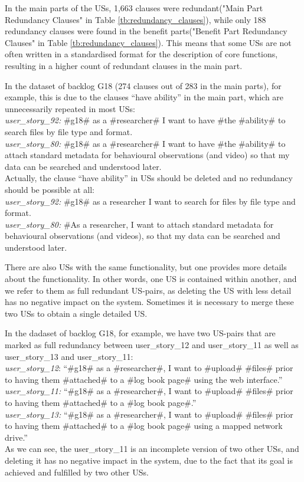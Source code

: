 In the main parts of the USs, 1,663 clauses were redundant("Main Part Redundancy Clauses" in Table \ref{tb:redundancy_clauses}), while only 188 redundancy clauses were found in the benefit parts("Benefit Part Redundancy Clauses" in Table \ref{tb:redundancy_clauses}). This means that some USs are not often written in a standardised format for the description of core functions, resulting in a higher count of redundant clauses in the main part.
\begin{example}
	In the dataset of backlog G18 (274 clauses out of 283 in the main parts), for example, this is due to the clauses \enquote{have ability} in the main part, which are unnecessarily repeated in most USs:\\
	\textit{user\_story\_92:} \#g18\# as a \#researcher\# I want to have \#the \#ability\# to search files by file type and format.\\
	\textit{user\_story\_80:} \#g18\# as a \#researcher\# I want to have \#the \#ability\# to attach standard metadata for behavioural observations (and video) so that my data can be searched and understood later.\\
	Actually, the clause \enquote{have ability} in USs should be deleted and no redundancy should be possible at all:\\
	\textit{user\_story\_92:} \#g18\# as a researcher I want to search for files by file type and format.\\
	\textit{user\_story\_80:} \#As a researcher, I want to attach standard metadata for behavioural observations (and videos), so that my data can be searched and understood later.
\end{example}

There are also USs with the same functionality, but one provides more details about the functionality. In other words, one US is contained within another, and we refer to them as full
redundant US-pairs, as deleting the US with less detail has no negative impact on the system. Sometimes it is necessary to merge these two USs to obtain a single detailed US.
\begin{example}
	In the dadaset of backlog G18, for example, we have two US-pairs that are marked as full redundancy between user\_story\_12 and user\_story\_11 as well as user\_story\_13 and user\_story\_11:\\
	\textit{user\_story\_12}: \enquote{\#g18\# as a \#researcher\#, I want to \#upload\# \#files\# prior to having them \#attached\# to a \#log book page\# using the web interface.}\\
	\textit{user\_story\_11:} \enquote{\#g18\# as a \#researcher\#, I want to \#upload\# \#files\# prior to having them \#attached\# to a \#log book page\#.}\\
	\textit{user\_story\_13:} \enquote{\#g18\# as a \#researcher\#, I want to \#upload\# \#files\# prior to having them \#attached\# to a \#log book page\# using a mapped network drive.}\\
	
	As we can see, the user\_story\_11 is an incomplete version of two other USs, and deleting it has no negative impact in the system, due to the fact that its goal is achieved and fulfilled by two other USs.
\end{example}
